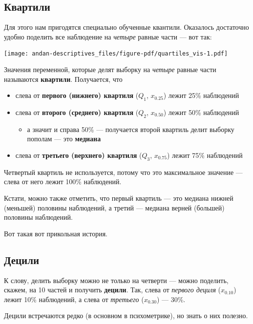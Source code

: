 \documentclass[
  letterpaper,
  DIV=11,
  numbers=noendperiod]{scrreprt}
\providecommand{\tightlist}{%
  \setlength{\itemsep}{0pt}\setlength{\parskip}{0pt}}\usepackage{longtable,booktabs,array}
\theoremstyle{definition}
\theoremstyle{remark}
\begin{document}
\subsection{Квартили}\label{quartiles}

Для этого нам пригодятся специально обученные квантили. Оказалось
достаточно удобно поделить все наблюдение на \emph{четыре} равные части
--- вот так:

\texttt{[image: andan-descriptives\_files/figure-pdf/quartiles\_vis-1.pdf]}

Значения переменной, которые делят выборку на \emph{четыре} равные части
называются \textbf{квартили}. Получается, что

\begin{itemize}
\tightlist
\item
  слева от \textbf{первого (нижнего) квартиля} (\(Q_1\), \(x_{0.25}\))
  лежит 25\% наблюдений
\item
  слева от \textbf{второго (среднего) квартиля} (\(Q_2\), \(x_{0.50}\))
  лежит 50\% наблюдений

  \begin{itemize}
  \tightlist
  \item
    а значит и справа 50\% --- получается второй квартиль делит выборку
    пополам --- это \textbf{медиана}
  \end{itemize}
\item
  слева от \textbf{третьего (верхнего) квартиля} (\(Q_3\), \(x_{0.75}\))
  лежит 75\% наблюдений
\end{itemize}

Четвертый квартиль не используется, потому что это максимальное значение
--- слева от него лежит 100\% наблюдений.

Кстати, можно также отметить, что первый квартиль --- это медиана нижней
(меньшей) половины наблюдений, а третий --- медиана верней (большей)
половины наблюдений.

Вот такая вот прикольная история.

\subsection{Децили}\label{deciles}

К слову, делить выборку можно не только на четверти --- можно поделить,
скажем, на 10 частей и получить \textbf{децили}. Так, слева от
\emph{первого дециля} (\(x_{0.10}\)) лежит 10\% наблюдений, а слева от
\emph{третьего} (\(x_{0.30}\)) --- 30\%.

Децили встречаются редко (в основном в психометрике), но знать о них
полезно.
\end{document}
